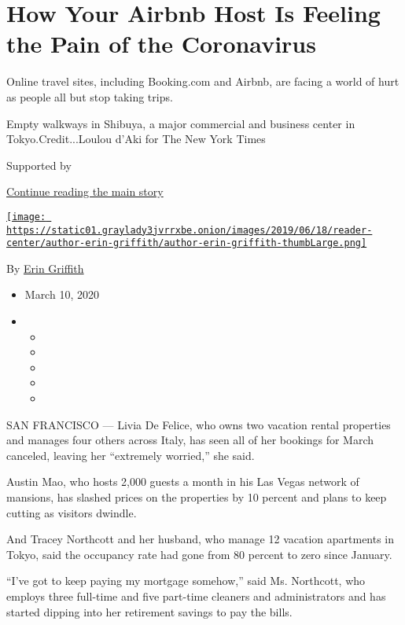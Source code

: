 \hypertarget{how-your-airbnb-host-is-feeling-the-pain-of-the-coronavirus}{%
\section{How Your Airbnb Host Is Feeling the Pain of the
Coronavirus}\label{how-your-airbnb-host-is-feeling-the-pain-of-the-coronavirus}}

Online travel sites, including Booking.com and Airbnb, are facing a
world of hurt as people all but stop taking trips.

Empty walkways in Shibuya, a major commercial and business center in
Tokyo.Credit...Loulou d'Aki for The New York Times

Supported by

\protect\hyperlink{after-sponsor}{Continue reading the main story}

\href{https://www.nytimes3xbfgragh.onion/by/erin-griffith}{\texttt{[image: https://static01.graylady3jvrrxbe.onion/images/2019/06/18/reader-center/author-erin-griffith/author-erin-griffith-thumbLarge.png]}}

By \href{https://www.nytimes3xbfgragh.onion/by/erin-griffith}{Erin
Griffith}

\begin{itemize}
\item
  March 10, 2020
\item
  \begin{itemize}
  \item
  \item
  \item
  \item
  \item
  \end{itemize}
\end{itemize}

SAN FRANCISCO --- Livia De Felice, who owns two vacation rental
properties and manages four others across Italy, has seen all of her
bookings for March canceled, leaving her ``extremely worried,'' she
said.

Austin Mao, who hosts 2,000 guests a month in his Las Vegas network of
mansions, has slashed prices on the properties by 10 percent and plans
to keep cutting as visitors dwindle.

And Tracey Northcott and her husband, who manage 12 vacation apartments
in Tokyo, said the occupancy rate had gone from 80 percent to zero since
January.

``I've got to keep paying my mortgage somehow,'' said Ms. Northcott, who
employs three full-time and five part-time cleaners and administrators
and has started dipping into her retirement savings to pay the bills.

